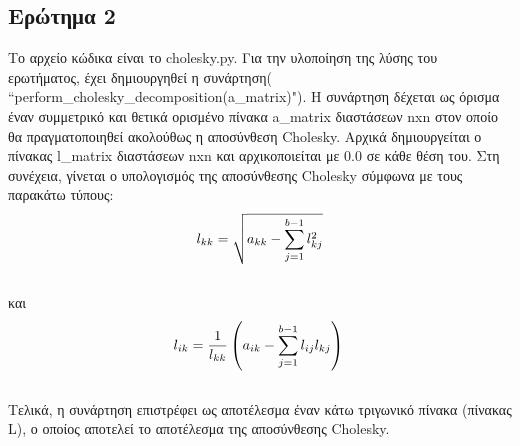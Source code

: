 \documentclass[a4paper,11pt]{article}
\newcommand{\lt}{\latintext}
\begin{document}
\subsection*{Ερώτημα 2}
Το αρχείο κώδικα είναι το {\lt cholesky.py}.
Για την υλοποίηση της λύσης του ερωτήματος, έχει δημιουργηθεί η συνάρτηση( {\lt ``perform\_cholesky\_decomposition(a\_matrix)"}). Η συνάρτηση δέχεται ως όρισμα έναν συμμετρικό και θετικά ορισμένο πίνακα {\lt a\_matrix} διαστάσεων {\lt nxn} στον οποίο θα πραγματοποιηθεί ακολούθως η αποσύνθεση {\lt Cholesky}. Αρχικά δημιουργείται ο πίνακας {\lt l\_matrix} διαστάσεων {\lt nxn} και αρχικοποιείται με 0.0 σε κάθε θέση του. Στη συνέχεια, γίνεται ο υπολογισμός της αποσύνθεσης {\lt Cholesky} σύμφωνα με τους παρακάτω τύπους:\\
\begin{equation*}
\\l_{kk} = \sqrt{ a_{kk} - \sum^{b-1}_{j=1} l^2_{kj}}\\
\end{equation*}
\\και\\
\begin{equation*}
\\ l_{ik} = \frac{1}{l_{kk}} \left( a_{ik} - \sum^{b-1}_{j=1} l_{ij} l_{kj} \right)\\
\end{equation*}
\\Τελικά, η συνάρτηση επιστρέφει ως αποτέλεσμα έναν κάτω τριγωνικό πίνακα (πίνακας {\lt L}), ο οποίος αποτελεί το αποτέλεσμα της αποσύνθεσης {\lt Cholesky}.
\end{document}
